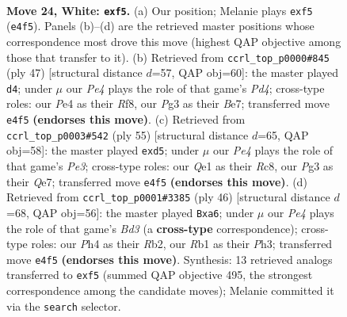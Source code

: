 \documentclass[11pt]{article}
\begin{document}
\clearpage

\begin{figure}[p]\centering
\begin{subfigure}{0.46\textwidth}\centering
\resizebox{\linewidth}{!}{%
\newchessgame
\chessboard[
  setfen={r1bq1rk1/8/6p1/2p1pp1p/4P2P/p1P3P1/P2B1P2/1R2QRK1 w - - 0 24},
  showmover=false,
  pgfstyle=straightmove, color=movearrow, markmove={e4-f5}
]}
\caption{}
\end{subfigure}\hfill
\begin{subfigure}{0.46\textwidth}\centering
\resizebox{\linewidth}{!}{%
\newchessgame
\chessboard[
  setfen={r3qrk1/4b1pp/2p1P3/2pp4/p3P3/P5P1/1P1Q2BP/R4RK1 b - - 0 24},
  showmover=false,
  pgfstyle=straightmove, color=movearrow, markmove={d5-d4}
]}
\caption{}
\end{subfigure}
\\[4pt]
\begin{subfigure}{0.46\textwidth}\centering
\resizebox{\linewidth}{!}{%
\newchessgame
\chessboard[
  setfen={2r2rk1/4q3/1p2p1p1/p1pP1pb1/P7/2P3PQ/1PB2P2/R2R2K1 b - - 0 28},
  showmover=false,
  pgfstyle=straightmove, color=movearrow, markmove={e6-d5}
]}
\caption{}
\end{subfigure}\hfill
\begin{subfigure}{0.46\textwidth}\centering
\resizebox{\linewidth}{!}{%
\newchessgame
\chessboard[
  setfen={r3r1k1/p4pp1/b1p4p/q1Pp4/P7/3BP2P/1RQ2PP1/5RK1 w - - 3 24},
  showmover=false,
  pgfstyle=straightmove, color=movearrow, markmove={d3-a6}
]}
\caption{}
\end{subfigure}
\caption{\textbf{Move 24, White: \texttt{exf5}.} (a) Our position; Melanie plays \texttt{exf5} (\texttt{e4f5}). Panels (b)--(d) are the retrieved master positions whose correspondence most drove this move (highest QAP objective among those that transfer to it). (b) Retrieved from \texttt{ccrl\_top\_p0000\#845} (ply 47) [structural distance $d$=57, QAP obj=60]: the master played \texttt{d4}; under $\mu$ our \emph{Pe4} plays the role of that game's \emph{Pd4}; cross-type roles: our \emph{P}e4 as their \emph{R}f8, our \emph{P}g3 as their \emph{B}e7; transferred move \texttt{e4f5} \textbf{(endorses this move)}. (c) Retrieved from \texttt{ccrl\_top\_p0003\#542} (ply 55) [structural distance $d$=65, QAP obj=58]: the master played \texttt{exd5}; under $\mu$ our \emph{Pe4} plays the role of that game's \emph{Pe3}; cross-type roles: our \emph{Q}e1 as their \emph{R}c8, our \emph{P}g3 as their \emph{Q}e7; transferred move \texttt{e4f5} \textbf{(endorses this move)}. (d) Retrieved from \texttt{ccrl\_top\_p0001\#3385} (ply 46) [structural distance $d$=68, QAP obj=56]: the master played \texttt{Bxa6}; under $\mu$ our \emph{Pe4} plays the role of that game's \emph{Bd3} (a \textbf{cross-type} correspondence); cross-type roles: our \emph{P}h4 as their \emph{R}b2, our \emph{R}b1 as their \emph{P}h3; transferred move \texttt{e4f5} \textbf{(endorses this move)}. Synthesis: 13 retrieved analogs transferred to \texttt{exf5} (summed QAP objective 495, the strongest correspondence among the candidate moves); Melanie committed it via the \texttt{search} selector.}
\label{fig:thought-m46}
\end{figure}
\end{document}

